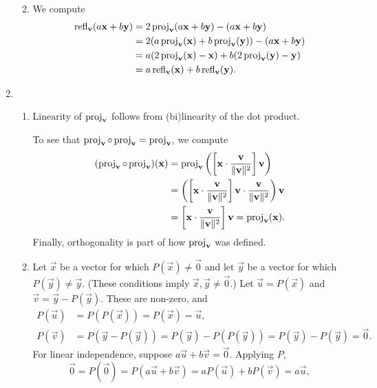 \begin{enumerate}
\begin{enumerate}
\begin{equation*}
\end{equation*}
\item We compute
\begin{align*}
\operatorname{refl}_{\mathbf{v}}(a\mathbf{x} + b\mathbf{y}) &= 2\operatorname{proj}_{\mathbf{v}}(a\mathbf{x} + b\mathbf{y}) - (a\mathbf{x} + b\mathbf{y}) \\
&= 2(a\operatorname{proj}_{\mathbf{v}}(\mathbf{x}) + b\operatorname{proj}_{\mathbf{v}}(\mathbf{y})) - (a\mathbf{x} + b\mathbf{y}) \\
&= a(2\operatorname{proj}_{\mathbf{v}}(\mathbf{x}) - \mathbf{x}) + b(2\operatorname{proj}_{\mathbf{v}}(\mathbf{y}) - \mathbf{y}) \\
&= a\operatorname{refl}_{\mathbf{v}}(\mathbf{x}) + b\operatorname{refl}_{\mathbf{v}}(\mathbf{y}).
\end{align*}
\end{enumerate}
\item \begin{enumerate}
\item Linearity of $\operatorname{proj}_{\mathbf{v}}$ follows from (bi)linearity of the dot product.\par
To see that $\operatorname{proj}_{\mathbf{v}}\circ\operatorname{proj}_{\mathbf{v}} = \operatorname{proj}_{\mathbf{v}}$, we compute
\begin{align*}
(\operatorname{proj}_{\mathbf{v}}\circ\operatorname{proj}_{\mathbf{v}})(\mathbf{x}) &= \operatorname{proj}_{\mathbf{v}}\left(\left[\mathbf{x}\cdot\frac{\mathbf{v}}{\|\mathbf{v}\|^2}\right]\mathbf{v}\right) \\
&= \left(\left[\mathbf{x}\cdot\frac{\mathbf{v}}{\|\mathbf{v}\|^2}\right]\mathbf{v}\cdot\frac{\mathbf{v}}{\|\mathbf{v}\|^2}\right)\mathbf{v} \\
&= \left[\mathbf{x}\cdot\frac{\mathbf{v}}{\|\mathbf{v}\|^2}\right]\mathbf{v} = \operatorname{proj}_{\mathbf{v}}(\mathbf{x}).
\end{align*}
Finally, orthogonality is part of how $\operatorname{proj}_{\mathbf{v}}$ was defined.
\item Let $\vec{x}$ be a vector for which $P(\vec{x})\neq\vec{0}$ and let $\vec{y}$ be a vector for which $P(\vec{y})\neq\vec{y}$. (These conditions imply $\vec{x},\vec{y}\neq\vec{0}$.) Let $\vec{u} = P(\vec{x})$ and $\vec{v} = \vec{y} - P(\vec{y})$. These are non-zero, and
\begin{align*}
P(\vec{u}) &= P(P(\vec{x})) = P(\vec{x}) = \vec{u}, \\
P(\vec{v}) &= P(\vec{y} - P(\vec{y})) = P(\vec{y}) - P(P(\vec{y})) = P(\vec{y}) - P(\vec{y}) = \vec{0}.
\end{align*}
For linear independence, suppose $a\vec{u} + b\vec{v} = \vec{0}$. Applying $P$,
\begin{equation*}
\vec{0} = P(\vec{0}) = P(a\vec{u} + b\vec{v}) = aP(\vec{u}) + bP(\vec{v}) = a\vec{u},
\end{equation*}

\end{enumerate}
\end{enumerate}
